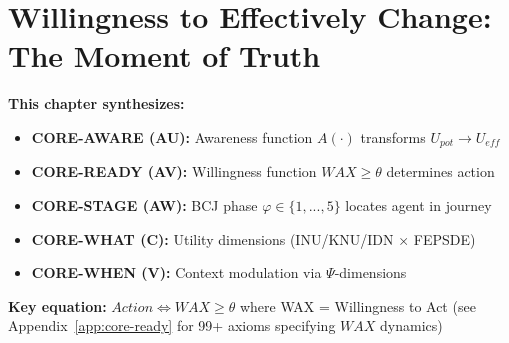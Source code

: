 
\chapter{Willingness to Effectively Change: The Moment of Truth}
\label{ch:wec}


\begin{tcolorbox}[colback=purple!5!white, colframe=purple!75!black,
    title=\textbf{10C CORE Framework Integration}]
\textbf{This chapter synthesizes:}
\begin{itemize}[nosep]
    \item \textbf{CORE-AWARE (AU):} Awareness function $A(\cdot)$ transforms $U_{pot} \to U_{eff}$
    \item \textbf{CORE-READY (AV):} Willingness function $WAX \geq \theta$ determines action
    \item \textbf{CORE-STAGE (AW):} BCJ phase $\varphi \in \{1,...,5\}$ locates agent in journey
    \item \textbf{CORE-WHAT (C):} Utility dimensions (INU/KNU/IDN × FEPSDE)
    \item \textbf{CORE-WHEN (V):} Context modulation via $\Psi$-dimensions
\end{itemize}

\textbf{Key equation:} $Action \Leftrightarrow WAX \geq \theta$ where WAX = Willingness to Act
(see Appendix~\ref{app:core-ready} for 99+ axioms specifying $WAX$ dynamics)
\end{tcolorbox}

